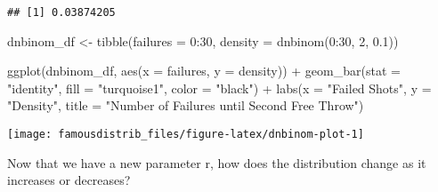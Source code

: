 \documentclass[
]{article}
\newenvironment{Shaded}{\begin{snugshade}}{\end{snugshade}}
\newcommand{\AttributeTok}[1]{\textcolor[rgb]{0.77,0.63,0.00}{#1}}
\newcommand{\DecValTok}[1]{\textcolor[rgb]{0.00,0.00,0.81}{#1}}
\newcommand{\FloatTok}[1]{\textcolor[rgb]{0.00,0.00,0.81}{#1}}
\newcommand{\FunctionTok}[1]{\textcolor[rgb]{0.00,0.00,0.00}{#1}}
\newcommand{\NormalTok}[1]{#1}
\newcommand{\OtherTok}[1]{\textcolor[rgb]{0.56,0.35,0.01}{#1}}
\newcommand{\SpecialCharTok}[1]{\textcolor[rgb]{0.00,0.00,0.00}{#1}}
\newcommand{\StringTok}[1]{\textcolor[rgb]{0.31,0.60,0.02}{#1}}
\begin{document}
\begin{verbatim}
## [1] 0.03874205
\end{verbatim}

\begin{Shaded}
\begin{Highlighting}[]
\NormalTok{dnbinom\_df }\OtherTok{\textless{}{-}} \FunctionTok{tibble}\NormalTok{(}\AttributeTok{failures =} \DecValTok{0}\SpecialCharTok{:}\DecValTok{30}\NormalTok{,}
                  \AttributeTok{density =} \FunctionTok{dnbinom}\NormalTok{(}\DecValTok{0}\SpecialCharTok{:}\DecValTok{30}\NormalTok{, }\DecValTok{2}\NormalTok{, }\FloatTok{0.1}\NormalTok{))}

\FunctionTok{ggplot}\NormalTok{(dnbinom\_df, }\FunctionTok{aes}\NormalTok{(}\AttributeTok{x =}\NormalTok{ failures, }\AttributeTok{y =}\NormalTok{ density)) }\SpecialCharTok{+}
  \FunctionTok{geom\_bar}\NormalTok{(}\AttributeTok{stat =} \StringTok{"identity"}\NormalTok{, }\AttributeTok{fill =} \StringTok{"turquoise1"}\NormalTok{, }\AttributeTok{color =} \StringTok{"black"}\NormalTok{) }\SpecialCharTok{+}
  \FunctionTok{labs}\NormalTok{(}\AttributeTok{x =} \StringTok{"Failed Shots"}\NormalTok{, }\AttributeTok{y =} \StringTok{"Density"}\NormalTok{, }
       \AttributeTok{title =} \StringTok{"Number of Failures until Second Free Throw"}\NormalTok{)}
\end{Highlighting}
\end{Shaded}

\begin{center}\texttt{[image: famousdistrib\_files/figure-latex/dnbinom-plot-1]} \end{center}

Now that we have a new parameter r, how does the distribution change as it increases or decreases?
\end{document}
